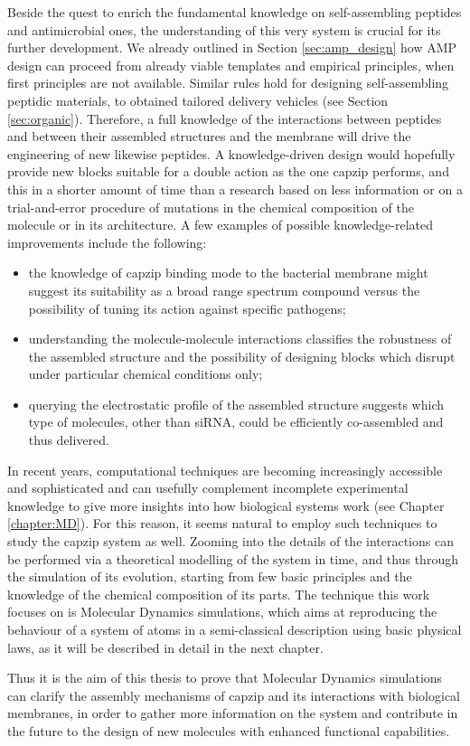 Beside the quest to enrich the fundamental knowledge on self-assembling peptides and antimicrobial ones, the understanding of this very system is crucial for its further development. We already outlined in Section \ref{sec:amp_design} how AMP design can proceed from already viable templates and empirical principles, when first principles are not available. Similar rules hold for designing self-assembling peptidic materials, to obtained tailored delivery vehicles (see Section \ref{sec:organic}).
%
Therefore, a full knowledge of the interactions between peptides and between their assembled structures and the membrane will drive the engineering of new likewise peptides. A knowledge-driven design would hopefully provide new blocks suitable for a double action as the one capzip performs, and this in a shorter amount of time than a research based on less information or on a trial-and-error procedure of mutations in the chemical composition of the molecule or in its architecture. A few examples of possible knowledge-related improvements include the following:
\begin{itemize}
\item the knowledge of capzip binding mode to the bacterial membrane might suggest its suitability as a broad range spectrum compound versus the possibility of tuning its action against specific pathogens;
\item understanding the molecule-molecule interactions classifies the robustness of the assembled structure and the possibility of designing blocks which disrupt under particular chemical conditions only;
\item querying the electrostatic profile of the assembled structure suggests which type of molecules, other than siRNA, could be efficiently co-assembled and thus delivered.
\end{itemize}

In recent years, computational techniques are becoming increasingly accessible and sophisticated and can usefully complement incomplete experimental knowledge to give more insights into how biological systems work (see Chapter \ref{chapter:MD}). For this reason, it seems natural to employ such techniques to study the capzip system as well. Zooming into the details of the interactions can be performed via a theoretical modelling of the system in time, and thus through the simulation of its evolution, starting from few basic principles and the knowledge of the chemical composition of its parts. The technique this work focuses on is Molecular Dynamics simulations, which aims at reproducing the behaviour of a system of atoms in a semi-classical description using basic physical laws, as it will be described in detail in the next chapter.

Thus it is the aim of this thesis to prove that Molecular Dynamics simulations can clarify the assembly mechanisms of capzip and its interactions with biological membranes, in order to gather more information on the system and contribute in the future to the design of new molecules with enhanced functional capabilities.
